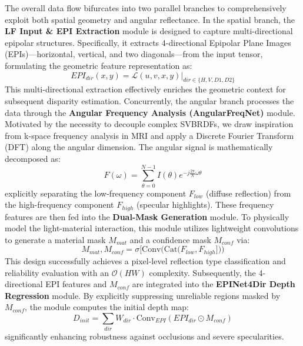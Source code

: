 \documentclass[lettersize,journal]{IEEEtran}
\begin{document}
The overall data flow bifurcates into two parallel branches to comprehensively exploit both spatial geometry and angular reflectance. In the spatial branch, the \textbf{LF Input & EPI Extraction} module is designed to capture multi-directional epipolar structures. Specifically, it extracts 4-directional Epipolar Plane Images (EPIs)—horizontal, vertical, and two diagonals—from the input tensor, formulating the geometric feature representation as:
\begin{equation}
\label{eq:eq1}
EPI_{dir}(x, y) = \mathcal{L}(u, v, x, y) \Big|_{dir \in \{H, V, D1, D2\}}
\end{equation}
This multi-directional extraction effectively enriches the geometric context for subsequent disparity estimation. Concurrently, the angular branch processes the data through the \textbf{Angular Frequency Analysis (AngularFreqNet)} module. Motivated by the necessity to decouple complex SVBRDFs, we draw inspiration from k-space frequency analysis in MRI and apply a Discrete Fourier Transform (DFT) along the angular dimension. The angular signal is mathematically decomposed as:
\begin{equation}
\label{eq:eq2}
F(\omega) = \sum_{\theta=0}^{N-1} I(\theta) e^{-j \frac{2\pi}{N} \omega \theta}
\end{equation}
explicitly separating the low-frequency component $F_{low}$ (diffuse reflection) from the high-frequency component $F_{high}$ (specular highlights). These frequency features are then fed into the \textbf{Dual-Mask Generation} module. To physically model the light-material interaction, this module utilizes lightweight convolutions to generate a material mask $M_{mat}$ and a confidence mask $M_{conf}$ via:
\begin{equation}
\label{eq:eq3}
M_{mat}, M_{conf} = \sigma\Big [\text{Conv}\big(\text{Cat}(F_{low}, F_{high}]\big)\Big)
\end{equation}
This design successfully achieves a pixel-level reflection type classification and reliability evaluation with an $\mathcal{O}(HW)$ complexity. Subsequently, the 4-directional EPI features and $M_{conf}$ are integrated into the \textbf{EPINet4Dir Depth Regression} module. By explicitly suppressing unreliable regions masked by $M_{conf}$, the module computes the initial depth map:
\begin{equation}
\label{eq:eq4}
D_{init} = \sum_{dir} W_{dir} \cdot \text{Conv}_{EPI}(EPI_{dir} \odot M_{conf})
\end{equation}
significantly enhancing robustness against occlusions and severe specularities.
\end{document}
